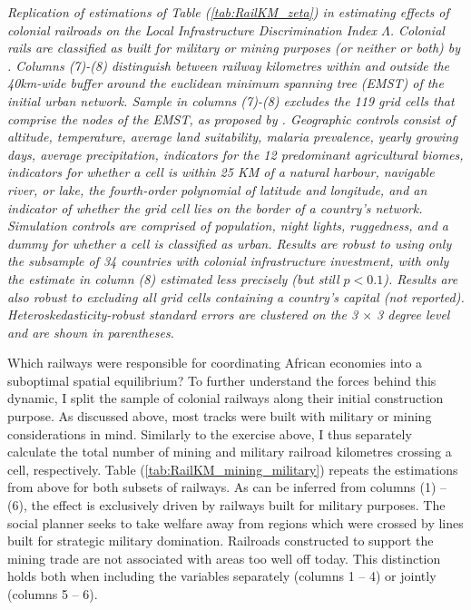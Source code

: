 \documentclass[11pt, oneside]{article}   	%
\let\oldref\ref
\renewcommand{\ref}[1]{(\oldref{#1})}
\newcommand{\mysubcaption}[1]{
\justify
\begin{spacing}{0.7}
\textit{\footnotesize #1}
\end{spacing}}
\begin{document}
\begin{table}[t]
{}

\mysubcaption{Replication of estimations of Table \ref{tab:RailKM_zeta} in estimating effects of colonial railroads on the Local Infrastructure Discrimination Index $\Lambda$. Colonial rails are classified as built for military or mining purposes (or neither or both) by \cite{jedwab_permanent_2016}. Columns (7)-(8) distinguish between railway kilometres within and outside the 40km-wide buffer around the euclidean minimum spanning tree (EMST) of the initial urban network. Sample in columns (7)-(8) excludes the 119 grid cells that comprise the nodes of the EMST, as proposed by \citeauthor{jedwab_permanent_2016}. Geographic controls consist of altitude, temperature, average land suitability, malaria prevalence, yearly growing days, average precipitation, indicators for the 12 predominant agricultural biomes, indicators for whether a cell is within 25 KM of a natural harbour, navigable river, or lake, the fourth-order polynomial of latitude and longitude, and an indicator of whether the grid cell lies on the border of a country's network. Simulation controls are comprised of population, night lights, ruggedness, and a dummy for whether a cell is classified as urban. Results are robust to using only the subsample of 34 countries with colonial infrastructure investment, with only the estimate in column (8) estimated less precisely (but still $p<0.1$). Results are also robust to excluding all grid cells containing a country's capital (not reported). Heteroskedasticity-robust standard errors are clustered on the 3 $\times$ 3 degree level and are shown in parentheses.}
\end{table}

Which railways were responsible for coordinating African economies into a suboptimal spatial equilibrium? To further understand the forces behind this dynamic, I split the sample of colonial railways along their initial construction purpose. As discussed above, most tracks were built with military or mining considerations in mind. Similarly to the exercise above, I thus separately calculate the total number of mining and military railroad kilometres crossing a cell, respectively. Table \ref{tab:RailKM_mining_military} repeats the estimations from above for both subsets of railways. As can be inferred from columns (1) -- (6), the effect is exclusively driven by railways built for military purposes. The social planner seeks to take welfare away from regions which were crossed by lines built for strategic military domination. Railroads constructed to support the mining trade are not associated with areas too well off today. This distinction holds both when including the variables separately (columns 1 -- 4) or jointly (columns 5 -- 6).
\end{document}
